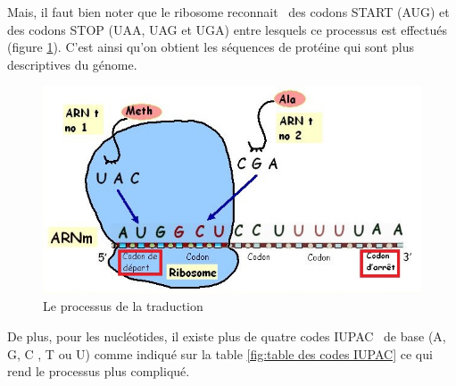 \documentclass[12pt]{article}
\begin{document}
Mais, il faut bien noter que le ribosome reconnait~\cite{synth} des codons START (AUG) et des codons STOP (UAA, UAG et UGA) entre lesquels ce processus est effectués (figure \ref{fig:Le processus de traduction}). C'est ainsi qu'on obtient les séquences de protéine qui sont plus descriptives du génome.\\

\newpage

        \begin{figure}[!h]
             \centering
             \includegraphics[scale = 0.7]{Images/Codons/traduction.jpg}
             \caption{Le processus de la traduction}
             \label{fig:Le processus de traduction}
        \end{figure}
        

De plus, pour les nucléotides, il existe plus de quatre codes IUPAC~\cite{nucl}  de base (A, G, C , T ou U) comme indiqué sur la table \ref{fig:table des codes IUPAC} ce qui rend le processus plus compliqué.\\
\end{document}
